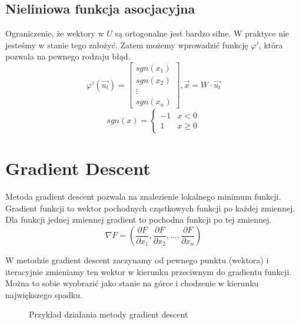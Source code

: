 \documentclass{../notatki}
\begin{document}
\subsection{Nieliniowa funkcja asocjacyjna}

Ograniczenie, że wektory w $U$ są ortogonalne jest bardzo silne.
W praktyce nie jesteśmy w stanie tego założyć. Zatem możemy wprowadzić
funkcję $\varphi'$, która pozwala na pewnego rodzaju błąd.
$$
\varphi'(\vec{u_t}) =
\begin{bmatrix}
  sgn(x_1) \\ sgn(x_2) \\ \vdots \\ sgn(x_n)
\end{bmatrix}, \vec{x} = W \cdot \vec{u_t}
$$
$$
sgn(x) =
\begin{cases}
  -1 & x < 0\\
  1 & x \geq 0
\end{cases}
$$

\section{Gradient Descent}

Metoda gradient descent pozwala na znalezienie lokalnego minimum funkcji.
Gradient funkcji to wektor pochodnych cząstkowych
funkcji po każdej zmiennej. Dla funkcji jednej zmiennej gradient to pochodna
funkcji po tej zmiennej.
$$
\nabla F = \left(\frac{\partial F}{\partial x_1}, \frac{\partial F}{\partial
x_2}, \dots, \frac{\partial F}{\partial x_n}\right)
$$

W metodzie gradient descent zaczynamy od pewnego punktu (wektora) i iteracyjnie
zmieniamy ten wektor w kierunku przeciwnym do gradientu funkcji. Można
to sobie wyobrazić jako stanie na górce i chodzenie w kierunku największego
spadku.
\begin{figure}[h]
  \centering
  \caption{Przykład działania metody gradient descent}
\end{figure}
\end{document}
